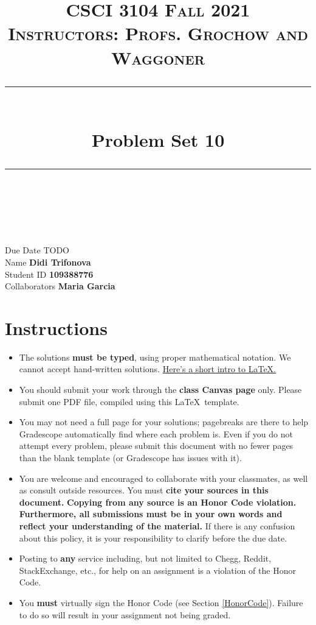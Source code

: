 \documentclass[11pt]{article}
\title{
\normalfont \normalsize 
\textsc{CSCI 3104 Fall 2021 \\ 
Instructors: Profs. Grochow and Waggoner} \\
[10pt] 
\rule{\linewidth}{0.5pt} \\[6pt] 
\huge Problem Set 10 \\
\rule{\linewidth}{2pt}  \\[10pt]
}
\date{}
\theoremstyle{definition}
\theoremstyle{definition}
\theoremstyle{definition}
\begin{document}
\maketitle


\noindent
Due Date \dotfill TODO \\
Name \dotfill \textbf{Didi Trifonova} \\
Student ID \dotfill \textbf{109388776} \\
Collaborators \dotfill \textbf{Maria Garcia}

\tableofcontents

\section{Instructions}
 \begin{itemize}
	\item The solutions \textbf{must be typed}, using proper mathematical notation. We cannot accept hand-written solutions. \href{http://ece.uprm.edu/~caceros/latex/introduction.pdf}{Here's a short intro to \LaTeX.}
	\item You should submit your work through the \textbf{class Canvas page} only. Please submit one PDF file, compiled using this \LaTeX \ template.
	\item You may not need a full page for your solutions; pagebreaks are there to help Gradescope automatically find where each problem is. Even if you do not attempt every problem, please submit this document with no fewer pages than the blank template (or Gradescope has issues with it).

	\item You are welcome and encouraged to collaborate with your classmates, as well as consult outside resources. You must \textbf{cite your sources in this document.} \textbf{Copying from any source is an Honor Code violation. Furthermore, all submissions must be in your own words and reflect your understanding of the material.} If there is any confusion about this policy, it is your responsibility to clarify before the due date. 

	\item Posting to \textbf{any} service including, but not limited to Chegg, Reddit, StackExchange, etc., for help on an assignment is a violation of the Honor Code.

	\item You \textbf{must} virtually sign the Honor Code (see Section \ref{HonorCode}). Failure to do so will result in your assignment not being graded.
\end{itemize}
\end{document}

